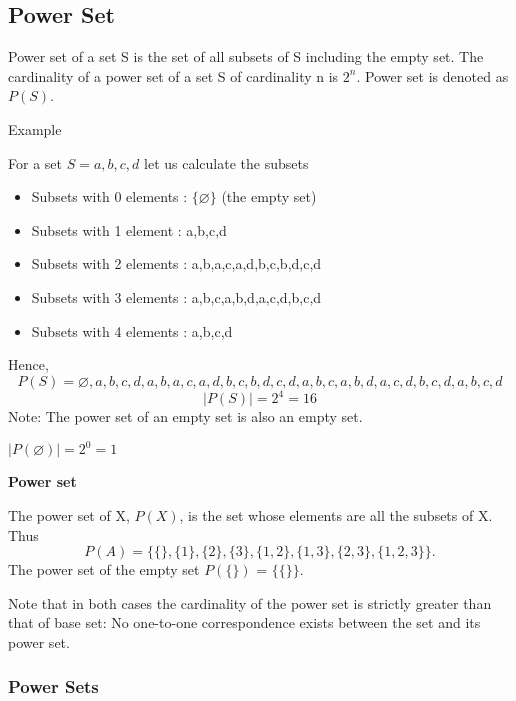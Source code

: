 \documentclass[12pt]{article}
\begin{document}
\subsection{Power Set}
Power set of a set S is the set of all subsets of S including the empty set. The cardinality of a power set of a set S of cardinality n is $2^n$. Power set is denoted as $P(S)$.

Example 

For a set $S={a,b,c,d}$ let us calculate the subsets 

\begin{itemize}
\item Subsets with 0 elements : $\{ \varnothing\}$ (the empty set)
\item Subsets with 1 element : {a},{b},{c},{d}
\item Subsets with 2 elements : {a,b},{a,c},{a,d},{b,c},{b,d},{c,d}
\item Subsets with 3 elements : {a,b,c},{a,b,d},{a,c,d},{b,c,d}
\item Subsets with 4 elements : {a,b,c,d}
\end{itemize}

Hence, \[P(S)=
{{\varnothing},{a},{b},{c},{d},{a,b},{a,c},{a,d},{b,c},{b,d},{c,d},{a,b,c},{a,b,d},{a,c,d},{b,c,d},{a,b,c,d}}\]
\[|P(S)|=2^4=16\]
Note: The power set of an empty set is also an empty set.

$|P({\varnothing})|=2^0=1$
\medskip

\textbf{Power set}

The power set of X, $P(X)$, is the set whose elements are all the subsets of X. Thus \[P(A) = \{ \{\}, \{1\}, \{2\}, \{3\}, \{1,2\}, \{1,3\}, \{2,3\}, \{1,2,3\}\}.\] The power set of the empty set $P(\{\})$ = $\{\{\}\}$. 

Note that in both cases the cardinality of the power set is strictly greater than that of base set: No one-to-one correspondence exists between the set and its power set. 





\subsubsection*{Power Sets}
\end{document}
